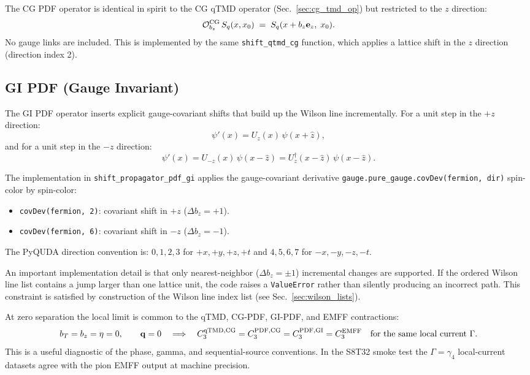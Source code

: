 \documentclass[11pt,a4paper]{article}
\begin{document}
The CG PDF operator is identical in spirit to the CG qTMD operator
(Sec.~\ref{sec:cg_tmd_op}) but restricted to the $z$ direction:
\begin{equation}
  \mathcal{O}^{\rm CG}_{b_z}\, S_q(x,x_0)
  \;=\;
  S_q(x + b_z\mathbf{e}_z,\; x_0).
\end{equation}
No gauge links are included.  This is implemented by the same
\verb|shift_qtmd_cg| function, which applies a lattice shift in the $z$
direction (direction index 2).

\subsection{GI PDF (Gauge Invariant)}

The GI PDF operator inserts explicit gauge-covariant shifts that build up the
Wilson line incrementally.  For a unit step in the $+z$ direction:
\begin{equation}
  \psi'(x) = U_z(x)\,\psi(x + \hat{z}),
\end{equation}
and for a unit step in the $-z$ direction:
\begin{equation}
  \psi'(x) = U_{-z}(x)\,\psi(x - \hat{z})
           = U_z^\dagger(x - \hat{z})\,\psi(x - \hat{z}).
\end{equation}

The implementation in \verb|shift_propagator_pdf_gi| applies the
gauge-covariant derivative
\texttt{gauge.pure\_gauge.covDev(fermion, dir)} spin-color by spin-color:
\begin{itemize}[nosep]
  \item \texttt{covDev(fermion, 2)}: covariant shift in $+z$ ($\Delta b_z =
        +1$).
  \item \texttt{covDev(fermion, 6)}: covariant shift in $-z$ ($\Delta b_z =
        -1$).
\end{itemize}
The PyQUDA direction convention is: $0,1,2,3$ for $+x,+y,+z,+t$ and
$4,5,6,7$ for $-x,-y,-z,-t$.

An important implementation detail is that only nearest-neighbor ($\Delta b_z =
\pm 1$) incremental changes are supported.  If the ordered Wilson line list
contains a jump larger than one lattice unit, the code raises a
\texttt{ValueError} rather than silently producing an incorrect path.  This
constraint is satisfied by construction of the Wilson line index list (see
Sec.~\ref{sec:wilson_lists}).

At zero separation the local limit is common to the qTMD, CG-PDF, GI-PDF, and
EMFF contractions:
\begin{equation}
  b_T = b_z = \eta = 0,\qquad \mathbf{q}=0
  \quad\Longrightarrow\quad
  C_3^{\rm qTMD,CG}
  =
  C_3^{\rm PDF,CG}
  =
  C_3^{\rm PDF,GI}
  =
  C_3^{\rm EMFF}
  \quad\text{for the same local current } \Gamma .
  \label{eq:qtmd_local_limit}
\end{equation}
This is a useful diagnostic of the phase, gamma, and sequential-source
conventions.  In the S8T32 smoke test the \(\Gamma=\gamma_4\) local-current
datasets agree with the pion EMFF output at machine precision.
\end{document}
